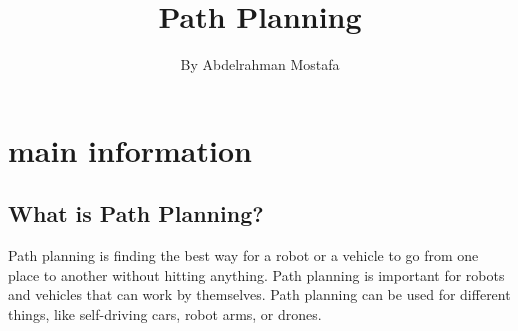 \documentclass{article}
\title{Path Planning}
\author{By Abdelrahman Mostafa}
\date{}
\begin{document}
\maketitle



\fontsize{18}{18}\selectfont

\section{main information}

\subsection{What is Path Planning?}
       	Path planning is finding the best way for a robot or a vehicle to go from one place to another without hitting anything. Path planning is important for robots and vehicles that can work by themselves. Path planning can be used for different things, like self-driving cars, robot arms, or drones.
\end{document}
